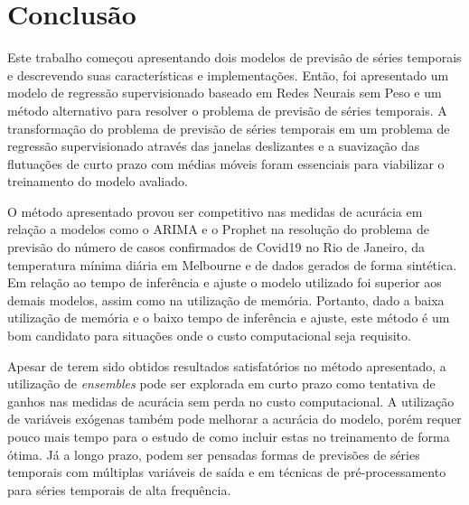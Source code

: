 \chapter{Conclusão}
Este trabalho começou apresentando dois modelos de previsão de séries temporais e descrevendo suas características e implementações. Então, foi apresentado um modelo de regressão supervisionado baseado em Redes Neurais sem Peso e um método alternativo para resolver o problema de previsão de séries temporais. A transformação do problema de previsão de séries temporais em um problema de regressão supervisionado através das janelas deslizantes e a suavização das flutuações de curto prazo com médias móveis foram essenciais para viabilizar o treinamento do modelo avaliado.

O método apresentado provou ser competitivo nas medidas de acurácia em relação a modelos como o ARIMA e o Prophet na resolução do problema de previsão do número de casos confirmados de Covid19 no Rio de Janeiro, da temperatura mínima diária em Melbourne e de dados gerados de forma sintética. Em relação ao tempo de inferência e ajuste o modelo utilizado foi superior aos demais modelos, assim como na utilização de memória. Portanto, dado a baixa utilização de memória e o baixo tempo de inferência e ajuste, este método é um bom candidato para situações onde o custo computacional seja requisito.

Apesar de terem sido obtidos resultados satisfatórios no método apresentado, a utilização de \textit{ensembles} pode ser explorada em curto prazo como tentativa de ganhos nas medidas de acurácia sem perda no custo computacional. A utilização de variáveis exógenas também pode melhorar a acurácia do modelo, porém requer pouco mais tempo para o estudo de como incluir estas no treinamento de forma ótima. Já a longo prazo, podem ser pensadas formas de previsões de séries temporais com múltiplas variáveis de saída e em técnicas de pré-processamento para séries temporais de alta frequência.

% 